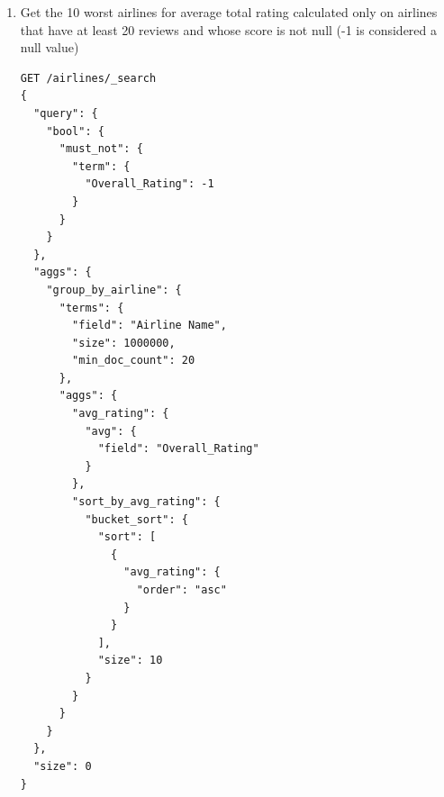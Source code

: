 \documentclass{Configuration_Files/PoliMi3i_thesis}
\begin{document}
\begin{enumerate}
\begin{figure}[H]
\end{figure}

\newpage

    \item Get the 10 worst airlines for average total rating calculated only on airlines that have at least 20 reviews and whose score is not null (-1 is considered a null value)

    \begin{verbatim}
GET /airlines/_search
{
  "query": {
    "bool": {
      "must_not": {
        "term": {
          "Overall_Rating": -1
        }
      }
    }
  },
  "aggs": {
    "group_by_airline": {
      "terms": {
        "field": "Airline Name",
        "size": 1000000, 
        "min_doc_count": 20
      },
      "aggs": {
        "avg_rating": {
          "avg": {
            "field": "Overall_Rating"
          }
        },
        "sort_by_avg_rating": {
          "bucket_sort": {
            "sort": [
              {
                "avg_rating": {
                  "order": "asc"  
                }
              }
            ],
            "size": 10 
          }
        }
      }
    }
  },
  "size": 0
}


\end{verbatim}
\end{enumerate}
\end{document}
